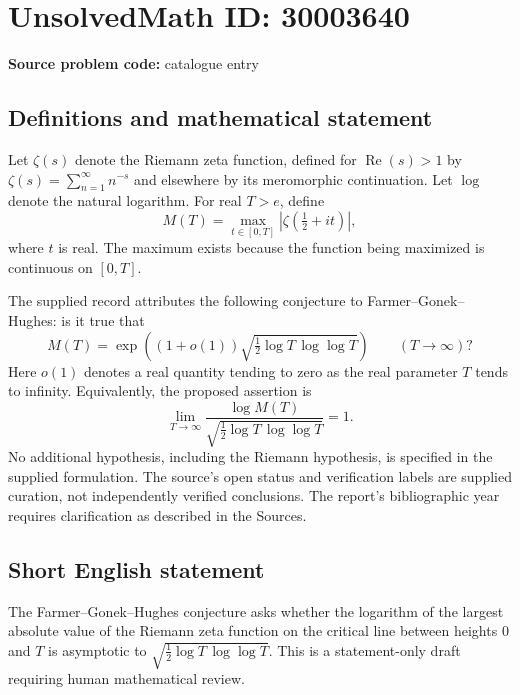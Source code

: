 \documentclass[11pt]{article}
\begin{document}
\section*{UnsolvedMath ID: 30003640}
\textbf{Source problem code:} catalogue entry
\subsection{Definitions and mathematical statement}
Let \(\zeta(s)\) denote the Riemann zeta function, defined for \(\operatorname{Re}(s)>1\) by \(\zeta(s)=\sum_{n=1}^{\infty}n^{-s}\) and elsewhere by its meromorphic continuation. Let \(\log\) denote the natural logarithm. For real \(T>e\), define
\[
M(T)=\max_{t\in[0,T]}\left|\zeta\!\left(\tfrac12+it\right)\right|,
\]
where \(t\) is real. The maximum exists because the function being maximized is continuous on \([0,T]\).

The supplied record attributes the following conjecture to Farmer--Gonek--Hughes: is it true that
\[
M(T)=\exp\!\left((1+o(1))\sqrt{\tfrac12\log T\,\log\log T}\right)
\qquad (T\to\infty)?
\]
Here \(o(1)\) denotes a real quantity tending to zero as the real parameter \(T\) tends to infinity. Equivalently, the proposed assertion is
\[
\lim_{T\to\infty}\frac{\log M(T)}{\sqrt{\tfrac12\log T\,\log\log T}}=1.
\]
No additional hypothesis, including the Riemann hypothesis, is specified in the supplied formulation. The source's open status and verification labels are supplied curation, not independently verified conclusions. The report's bibliographic year requires clarification as described in the Sources.
\subsection{Short English statement}
The Farmer--Gonek--Hughes conjecture asks whether the logarithm of the largest absolute value of the Riemann zeta function on the critical line between heights \(0\) and \(T\) is asymptotic to \(\sqrt{\tfrac12\log T\,\log\log T}\). This is a statement-only draft requiring human mathematical review.
\end{document}
